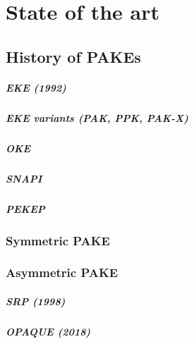 \documentclass[../report.tex]{subfiles}
\begin{document}




\chapter{State of the art}

\section{History of PAKEs}
\paragraph{EKE (1992)}
\paragraph{EKE variants (PAK, PPK, PAK-X)}
\paragraph{OKE}
\paragraph{SNAPI}
\paragraph{PEKEP}
\subsection{Symmetric PAKE}
\subsection{Asymmetric PAKE}
\paragraph{SRP (1998)}
\paragraph{OPAQUE (2018)}
\end{document}
